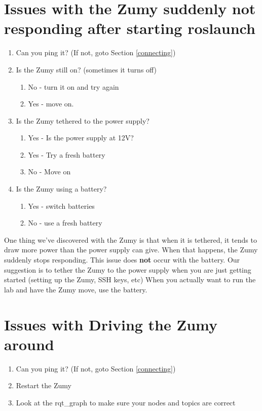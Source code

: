 \documentclass[10pt]{article}
\begin{document}
\section{Issues with the Zumy suddenly not responding after starting roslaunch}
\begin{enumerate}
  \item Can you ping it?  (If not, goto Section \ref{connecting})
  \item Is the Zumy still on? (sometimes it turns off)
  \begin{enumerate}
    \item No - turn it on and try again
    \item Yes - move on. 
  \end{enumerate}  
  \item Is the Zumy tethered to the power supply?
  \begin{enumerate}
    \item Yes - Is the power supply at 12V?
    \item Yes - Try a fresh battery
    \item No - Move on
  \end{enumerate}  
  \item Is the Zumy using a battery?
  \begin{enumerate}
    \item Yes - switch batteries
    \item No - use a fresh battery
  \end{enumerate}  
\end{enumerate}

One thing we've discovered with the Zumy is that when it is tethered, it tends to draw more power than the power supply can give.
When that happens, the Zumy suddenly stops responding.
This issue does \textbf{not} occur with the battery.
Our suggestion is to tether the Zumy to the power supply when you are just getting started (setting up the Zumy, SSH keys, etc)
When you actually want to run the lab and have the Zumy move, use the battery.

\section{Issues with Driving the Zumy around}

\begin{enumerate}
  \item Can you ping it?  (If not, goto Section \ref{connecting})
  \item Restart the Zumy
  \item Look at the rqt\_graph to make sure your nodes and topics are correct
\end{enumerate}
\end{document}
